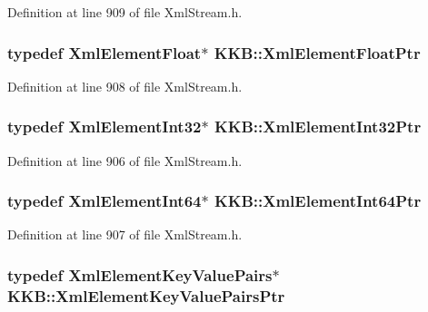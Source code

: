 Definition at line 909 of file Xml\+Stream.\+h.

\subsubsection[{\texorpdfstring{Xml\+Element\+Float\+Ptr}{XmlElementFloatPtr}}]{\setlength{\rightskip}{0pt plus 5cm}typedef {\bf Xml\+Element\+Float}$\ast$ {\bf K\+K\+B\+::\+Xml\+Element\+Float\+Ptr}}\hypertarget{namespace_k_k_b_af6e477e83a6849fc80fc90d8825dde20}{}\label{namespace_k_k_b_af6e477e83a6849fc80fc90d8825dde20}


Definition at line 908 of file Xml\+Stream.\+h.

\subsubsection[{\texorpdfstring{Xml\+Element\+Int32\+Ptr}{XmlElementInt32Ptr}}]{\setlength{\rightskip}{0pt plus 5cm}typedef {\bf Xml\+Element\+Int32}$\ast$ {\bf K\+K\+B\+::\+Xml\+Element\+Int32\+Ptr}}\hypertarget{namespace_k_k_b_aff7fa8ba87251c175155c585c355d591}{}\label{namespace_k_k_b_aff7fa8ba87251c175155c585c355d591}


Definition at line 906 of file Xml\+Stream.\+h.

\subsubsection[{\texorpdfstring{Xml\+Element\+Int64\+Ptr}{XmlElementInt64Ptr}}]{\setlength{\rightskip}{0pt plus 5cm}typedef {\bf Xml\+Element\+Int64}$\ast$ {\bf K\+K\+B\+::\+Xml\+Element\+Int64\+Ptr}}\hypertarget{namespace_k_k_b_ab249ee3d7ebb47ff0b787fc3bfbfc4a0}{}\label{namespace_k_k_b_ab249ee3d7ebb47ff0b787fc3bfbfc4a0}


Definition at line 907 of file Xml\+Stream.\+h.

\subsubsection[{\texorpdfstring{Xml\+Element\+Key\+Value\+Pairs\+Ptr}{XmlElementKeyValuePairsPtr}}]{\setlength{\rightskip}{0pt plus 5cm}typedef {\bf Xml\+Element\+Key\+Value\+Pairs}$\ast$ {\bf K\+K\+B\+::\+Xml\+Element\+Key\+Value\+Pairs\+Ptr}}\hypertarget{namespace_k_k_b_a5c3670747a7bb32d79c02d2629327430}{}\label{namespace_k_k_b_a5c3670747a7bb32d79c02d2629327430}


